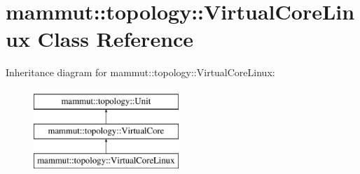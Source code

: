 \hypertarget{classmammut_1_1topology_1_1VirtualCoreLinux}{\section{mammut\-:\-:topology\-:\-:Virtual\-Core\-Linux Class Reference}
\label{classmammut_1_1topology_1_1VirtualCoreLinux}
}
Inheritance diagram for mammut\-:\-:topology\-:\-:Virtual\-Core\-Linux\-:\begin{figure}[H]
\begin{center}
\leavevmode
\includegraphics[height=3.000000cm]{classmammut_1_1topology_1_1VirtualCoreLinux}
\end{center}
\end{figure}
